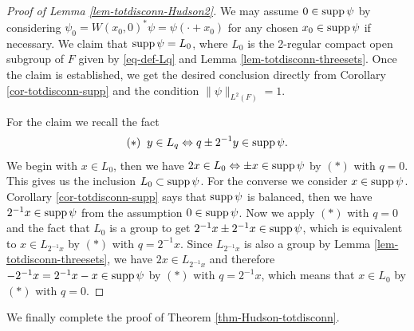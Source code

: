 \documentclass[12pt,reqno]{amsart}
\theoremstyle{definition}
\theoremstyle{definition}
\theoremstyle{definition}
\numberwithin{thm}{section}
\numberwithin{equation}{section}
\begin{document}
\begin{proof}[Proof of Lemma \ref{lem-totdisconn-Hudson2}]
We may assume $0\in {\rm supp}\,\psi$ by considering $\psi_0=W(x_0,0)^*\psi=\psi(\cdot+x_0)$ for any chosen $x_0\in {\rm supp}\,\psi$ if necessary. We claim that ${\rm supp}\,\psi=L_0$, where $L_0$ is the 2-regular compact open subgroup of $F$ given by \eqref{eq-def-Lq} and Lemma \ref{lem-totdisconn-threesets}. Once the claim is established, we get the desired conclusion directly from Corollary \ref{cor-totdisconn-supp} and the condition $\|\psi\|_{L^2(F)}=1$.

For the claim we recall the fact
    $$(*)\;\; y \in L_q \Leftrightarrow q \pm 2^{-1}y \in {\rm supp}\,\psi.$$
We begin with $x\in L_0$, then we have $2x\in L_0 \Leftrightarrow \pm x \in {\rm supp}\,\psi$ by $(*)$ with $q=0$. This gives us the inclusion $L_0\subset {\rm supp}\,\psi$.
For the converse we consider $x\in {\rm supp}\,\psi$. Corollary \ref{cor-totdisconn-supp} says that ${\rm supp}\,\psi$ is balanced, then we have $2^{-1}x\in {\rm supp}\,\psi$ from the assumption $0\in {\rm supp}\,\psi$. Now we apply $(*)$ with $q=0$ and the fact that $L_0$ is a group to get  $2^{-1}x\pm 2^{-1}x\in {\rm supp}\,\psi$, which is equivalent to $x\in L_{2^{-1}x}$ by $(*)$ with $q=2^{-1}x$. Since $L_{2^{-1}x}$ is also a group by Lemma \ref{lem-totdisconn-threesets}, we have $2x\in L_{2^{-1}x}$ and therefore $-2^{-1}x=2^{-1}x-x\in {\rm supp}\,\psi$ by $(*)$ with $q=2^{-1}x$, which means that $x\in L_0$ by $(*)$ with $q=0$.
\end{proof}


We finally complete the proof of Theorem \ref{thm-Hudson-totdisconn}.
\end{document}
